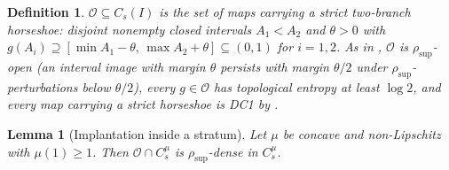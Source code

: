 \documentclass[11pt]{article}
\newtheorem{lemma}[theorem]{Lemma}
\newtheorem{definition}[theorem]{Definition}
\newcommand{\I}{I}
\newcommand{\Cs}{C_s(\I)}
\newcommand{\rsup}{\rho_{\sup}}
\begin{document}
\begin{definition}\label{def:O-recall}
$\mathcal O\subseteq\Cs$ is the set of maps carrying a \emph{strict two-branch
horseshoe}: disjoint nonempty closed intervals $A_1<A_2$ and $\theta>0$ with
$g(A_i)\supseteq[\min A_1-\theta,\,\max A_2+\theta]\subseteq(0,1)$ for $i=1,2$.
As in \cite{companion}, $\mathcal O$ is $\rsup$-open (an interval image with
margin $\theta$ persists with margin $\theta/2$ under $\rsup$-perturbations below
$\theta/2$), every $g\in\mathcal O$ has topological entropy at least $\log2$, and
every map carrying a strict horseshoe is DC1 by \cite{SS}.
\end{definition}

\begin{lemma}[Implantation inside a stratum]\label{lem:stratum-implant}
Let $\mu$ be concave and non-Lipschitz with $\mu(1)\ge1$.  Then
$\mathcal O\cap C^\mu_s$ is $\rsup$-dense in $C^\mu_s$.
\end{lemma}
\end{document}
